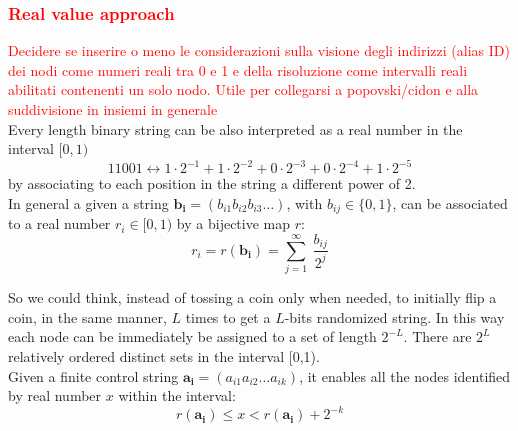 \documentclass[12pt,a4paper]{report}
\begin{document}
\subsubsection{\textcolor{red}{Real value approach}}
\label{realvalueapproach}
\textcolor{red}{Decidere se inserire o meno le considerazioni sulla visione degli indirizzi (alias ID) dei nodi come numeri reali tra 0 e 1 e della risoluzione come intervalli reali abilitati contenenti un solo nodo. Utile per collegarsi a popovski/cidon e alla suddivisione in insiemi in generale}\\
Every length binary string can be also interpreted as a real number in the interval $[0,1)$
\begin{equation*}
11001 \leftrightarrow 1 \cdot 2^{-1} + 1 \cdot 2^{-2} + 0 \cdot 2^{-3} + 0 \cdot 2^{-4} +1 \cdot 2^{-5} 
\end{equation*}
by associating to each position in the string a different power of 2.\\
In general a given a string $\mathbf{b_{i}}=(b_{i1}b_{i2}b_{i3}\ldots)$, with $b_{ij} \in \{0,1\}$, can be associated to a real number $r_{i} \in [0,1)$ by a bijective map $r$:\\

\begin{equation}
r_{i}=r(\mathbf{b_{i}})=\sum_{j=1}^{\infty} \ \frac{b_{ij}}{2^{j}}
\end{equation}

So we could think, instead of tossing a coin only when needed, to initially flip a coin, in the same manner, $L$ times to get a $L$-bits randomized string.
In this way each node can be immediately be assigned to a set of length $2^{-L}$. There are $2^{L}$ relatively ordered distinct sets in the interval [0,1).\\
Given a finite control string $\mathbf{a_{i}}=(a_{i1}a_{i2}\ldots a_{ik})$, it enables all the nodes identified by real number $x$ within the interval:
\begin{equation}
	r(\mathbf{a_{i}})\leq x <r(\mathbf{a_{i}})+2^{-k}
\end{equation}
\end{document}
